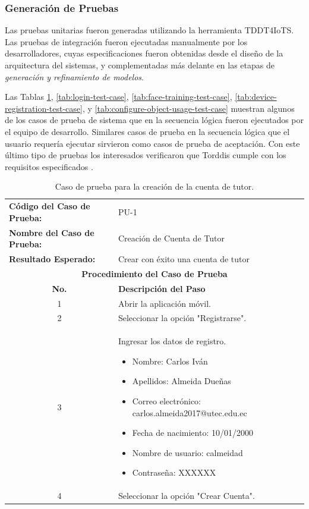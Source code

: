 \documentclass[a4paper,fleqn]{cas-sc}
\begin{document}
			\subsubsection{Generación de Pruebas}
				Las pruebas unitarias fueron generadas utilizando la herramienta TDDT4IoTS. Las pruebas de integración fueron ejecutadas manualmente por los desarrolladores, cuyas especificaciones fueron obtenidas desde el diseño de la arquitectura del sistemas, y complementadas más delante en las etapas de \textit{generación y refinamiento de modelos}.
				
				Las Tablas \ref{tab:create-tutor-account-test-case}, \ref{tab:login-test-case}, \ref{tab:face-training-test-case}, \ref{tab:device-registration-test-case}, y \ref{tab:configure-object-usage-test-case} muestran algunos de los casos de prueba de sistema que en la secuencia lógica fueron ejecutados por el equipo de desarrollo. Similares casos de prueba en la secuencia lógica que el usuario requería ejecutar sirvieron como casos de prueba de aceptación. Con este último tipo de pruebas los interesados verificaron que Torddis cumple con los requisitos especificados \citep{Sciarra2024Smash}.
				
				\begin{table}[hbt!]
					\centering
					\caption{Caso de prueba para la creación de la cuenta de tutor.}
					\label{tab:create-tutor-account-test-case}
					\begin{tabularx}{\textwidth}{l X}
						\toprule
						\textbf{Código del Caso de Prueba:} & PU-1 \\
						\textbf{Nombre del Caso de Prueba:} & Creación de Cuenta de Tutor \\
						\textbf{Resultado Esperado:} & Crear con éxito una cuenta de tutor \\
						\midrule
						\multicolumn{2}{c}{\textbf{Procedimiento del Caso de Prueba}} \\
						\midrule
						\multicolumn{1}{c}{\textbf{No.}} & \textbf{Descripción del Paso} \\
						\midrule
						\multicolumn{1}{c}{1} & Abrir la aplicación móvil. \\
						\multicolumn{1}{c}{2} & Seleccionar la opción "Registrarse". \\
						\multicolumn{1}{c}{3} & Ingresar los datos de registro.
						\begin{itemize}
							\item Nombre: Carlos Iván
							\item Apellidos: Almeida Dueñas
							\item Correo electrónico: carlos.almeida2017@utec.edu.ec
							\item Fecha de nacimiento: 10/01/2000
							\item Nombre de usuario: calmeidad
							\item Contraseña: XXXXXX
						\end{itemize}\\
						\multicolumn{1}{c}{4} & Seleccionar la opción "Crear Cuenta". \\
						\bottomrule
					\end{tabularx}
				\end{table}
				
\end{document}
